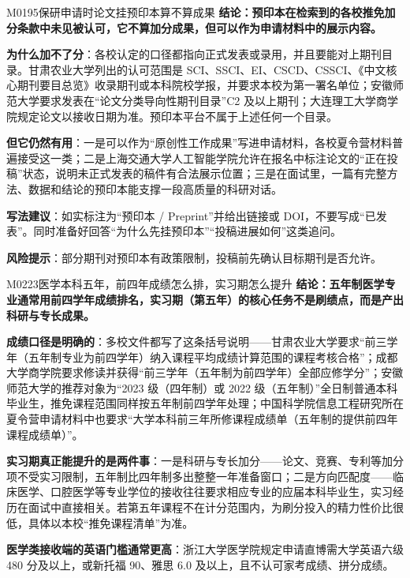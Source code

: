 \begin{qa}{M0195}{保研申请时论文挂预印本算不算成果}
\textbf{结论：预印本在检索到的各校推免加分条款中未见被认可，它不算加分成果，但可以作为申请材料中的展示内容。}

\textbf{为什么加不了分}：各校认定的口径都指向正式发表或录用，并且要能对上期刊目录。甘肃农业大学列出的认可范围是 SCI、SSCI、EI、CSCD、CSSCI、《中文核心期刊要目总览》收录期刊或本科院校学报，并要求本校为第一署名单位；安徽师范大学要求发表在“论文分类导向性期刊目录”C2 及以上期刊；大连理工大学商学院规定论文以接收日期为准。预印本平台不属于上述任何一个目录。

\textbf{但它仍然有用}：一是可以作为“原创性工作成果”写进申请材料，各校夏令营材料普遍接受这一类；二是上海交通大学人工智能学院允许在报名中标注论文的“正在投稿”状态，说明未正式发表的稿件有合法展示位置；三是在面试里，一篇有完整方法、数据和结论的预印本能支撑一段高质量的科研对话。

\textbf{写法建议}：如实标注为“预印本 / Preprint”并给出链接或 DOI，不要写成“已发表”。同时准备好回答“为什么先挂预印本”“投稿进展如何”这类追问。

\textbf{风险提示}：部分期刊对预印本有政策限制，投稿前先确认目标期刊是否允许。
\end{qa}

\begin{qa}{M0223}{医学本科五年，前四年成绩怎么排，实习期怎么提升}
\textbf{结论：五年制医学专业通常用前四学年成绩排名，实习期（第五年）的核心任务不是刷绩点，而是产出科研与专长成果。}

\textbf{成绩口径是明确的}：多校文件都写了这条括号说明——甘肃农业大学要求“前三学年（五年制专业为前四学年）纳入课程平均成绩计算范围的课程考核合格”；成都大学商学院要求修读并获得“前三学年（五年制为前四学年）全部应修学分”；安徽师范大学的推荐对象为“2023 级（四年制）或 2022 级（五年制）”全日制普通本科毕业生，推免课程范围同样按五年制前四学年处理；中国科学院信息工程研究所在夏令营申请材料中也要求“大学本科前三年所修课程成绩单（五年制的提供前四年课程成绩单）”。

\textbf{实习期真正能提升的是两件事}：一是科研与专长加分——论文、竞赛、专利等加分项不受实习限制，五年制比四年制多出整整一年准备窗口；二是方向匹配度——临床医学、口腔医学等专业学位的接收往往要求相应专业的应届本科毕业生，实习经历在面试中直接相关。若第五年课程不在计分范围内，为刷分投入的精力性价比很低，具体以本校“推免课程清单”为准。

\textbf{医学类接收端的英语门槛通常更高}：浙江大学医学院规定申请直博需大学英语六级 480 分及以上，或新托福 90、雅思 6.0 及以上，且不认可家考成绩、拼分成绩。
\end{qa}

